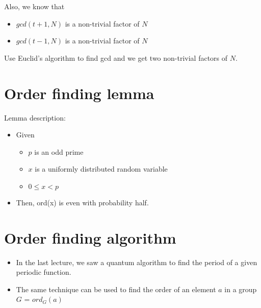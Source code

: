 \documentclass[12pt]{article}
\begin{document}
Also, we know that

\begin{itemize}
\item $gcd(t+1, N)$ is a non-trivial factor of $N$
\item $gcd(t-1, N)$ is a non-trivial factor of $N$
\end{itemize}

Use Euclid's algorithm to find gcd and we get two non-trivial factors
of $N$.

\section{Order finding lemma}

Lemma description:
\begin{itemize}
\item Given
  \begin{itemize}
  \item $p$ is an odd prime
  \item $x$ is a uniformly distributed random variable
  \item $0 \le x < p$
  \end{itemize}
\item Then, ord(x) is even with probability half.
\end{itemize}

\section{Order finding algorithm}

\begin{itemize}
\item 
  In the last lecture, we saw a quantum algorithm to find the period of
  a given periodic function.
\item 
  The same technique can be used to find the order of an element $a$
  in a group $G$ = $ord_G(a)$
\end{itemize}
\end{document}
